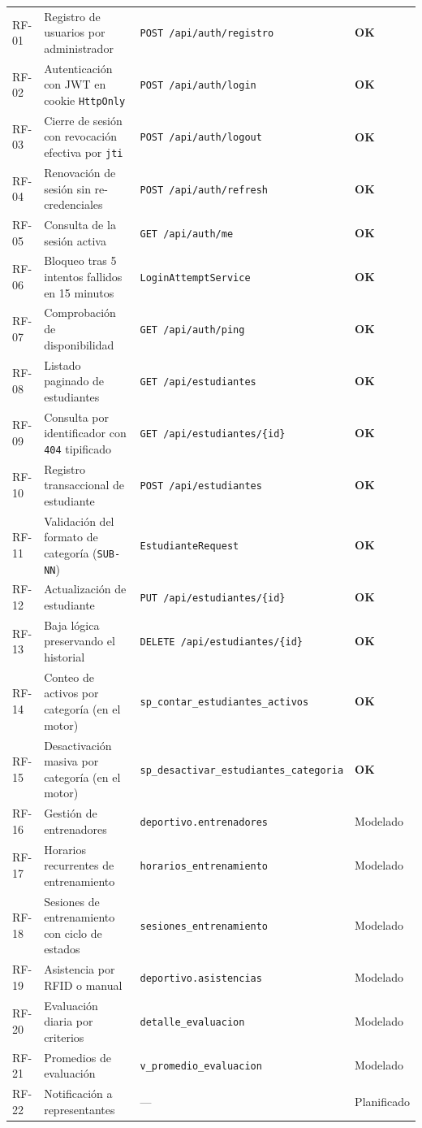 \documentclass[11pt,a4paper]{article}
\newcommand{\ok}{\textcolor{okverde}{\textbf{OK}}}
\begin{document}
\begin{longtable}{@{}p{1.3cm}p{7.4cm}p{4.6cm}p{1.7cm}@{}}
RF-01 & Registro de usuarios por administrador & \texttt{POST /api/auth/registro} & \ok \\
RF-02 & Autenticación con JWT en cookie \texttt{HttpOnly} & \texttt{POST /api/auth/login} & \ok \\
RF-03 & Cierre de sesión con revocación efectiva por \texttt{jti} & \texttt{POST /api/auth/logout} & \ok \\
RF-04 & Renovación de sesión sin re-credenciales & \texttt{POST /api/auth/refresh} & \ok \\
RF-05 & Consulta de la sesión activa & \texttt{GET /api/auth/me} & \ok \\
RF-06 & Bloqueo tras 5 intentos fallidos en 15 minutos & \texttt{LoginAttemptService} & \ok \\
RF-07 & Comprobación de disponibilidad & \texttt{GET /api/auth/ping} & \ok \\
RF-08 & Listado paginado de estudiantes & \texttt{GET /api/estudiantes} & \ok \\
RF-09 & Consulta por identificador con \texttt{404} tipificado & \texttt{GET /api/estudiantes/\{id\}} & \ok \\
RF-10 & Registro transaccional de estudiante & \texttt{POST /api/estudiantes} & \ok \\
RF-11 & Validación del formato de categoría (\texttt{SUB-NN}) & \texttt{EstudianteRequest} & \ok \\
RF-12 & Actualización de estudiante & \texttt{PUT /api/estudiantes/\{id\}} & \ok \\
RF-13 & Baja lógica preservando el historial & \texttt{DELETE /api/estudiantes/\{id\}} & \ok \\
RF-14 & Conteo de activos por categoría (en el motor) & \texttt{sp\_contar\_estudiantes\_activos} & \ok \\
RF-15 & Desactivación masiva por categoría (en el motor) & \texttt{sp\_desactivar\_estudiantes\_categoria} & \ok \\
\midrule
RF-16 & Gestión de entrenadores & \texttt{deportivo.entrenadores} & Modelado \\
RF-17 & Horarios recurrentes de entrenamiento & \texttt{horarios\_entrenamiento} & Modelado \\
RF-18 & Sesiones de entrenamiento con ciclo de estados & \texttt{sesiones\_entrenamiento} & Modelado \\
RF-19 & Asistencia por RFID o manual & \texttt{deportivo.asistencias} & Modelado \\
RF-20 & Evaluación diaria por criterios & \texttt{detalle\_evaluacion} & Modelado \\
RF-21 & Promedios de evaluación & \texttt{v\_promedio\_evaluacion} & Modelado \\
RF-22 & Notificación a representantes & --- & Planificado \\
\bottomrule
\end{longtable}
\renewcommand{\arraystretch}{1}
\end{document}
